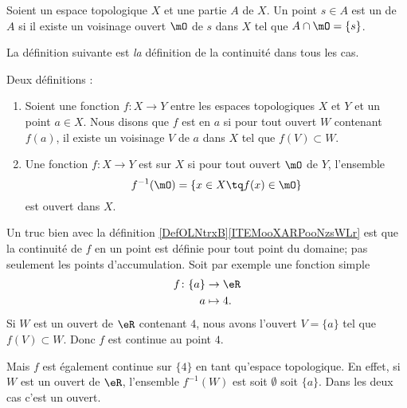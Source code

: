 \begin{definition}      \label{DEFooXIOWooWUKJhN}
	Soient un espace topologique \( X\) et une partie \( A\) de \( X\). Un point \( s\in A \) est un  de \( A\) si il existe un voisinage ouvert \( \mO\) de \( s\) dans \( X\) tel que \( A\cap\mO=\{ s \}\).
\end{definition}

La définition suivante est \emph{la} définition de la continuité dans tous les cas.
\begin{definition}\label{DefOLNtrxB}
	Deux définitions :
	\begin{enumerate}
		\item   \label{ITEMooXARPooNzsWLr}
		      Soient une fonction \( f\colon X\to Y\) entre les espaces topologiques \( X\) et \( Y\) et un point \( a\in X\). Nous disons que \( f\) est  en \( a\) si pour tout ouvert \( W\) contenant \( f(a)\), il existe un voisinage \( V\) de \( a\) dans \( X\) tel que \( f(V)\subset W\).
		\item       \label{ITEMooEHGWooDdITRV}
		      Une fonction \( f\colon X\to Y\) est  sur \( X\) si pour tout ouvert \( \mO\) de \( Y\), l'ensemble
		      \begin{equation}      \label{defFminus1ofaset}
			      f^{-1}(\mO) = \{ x \in X \tq f(x) \in \mO\}
		      \end{equation}
		      est ouvert dans \( X\).
	\end{enumerate}
\end{definition}

\begin{example}
	Un truc bien avec la définition \ref{DefOLNtrxB}\ref{ITEMooXARPooNzsWLr} est que la continuité de \( f\) en un point est définie pour tout point du domaine; pas seulement les points d'accumulation. Soit par exemple une fonction simple
	\begin{equation}
		\begin{aligned}
			f\colon \{a\} & \to \eR    \\
			a             & \mapsto 4.
		\end{aligned}
	\end{equation}
	Si \( W\) est un ouvert de \( \eR\) contenant \( 4\), nous avons l'ouvert \( V=\{a\}\) tel que \( f(V)\subset W\). Donc \( f\) est continue au point \( 4\).

	Mais \( f\) est également continue sur \( \{4\}\) en tant qu'espace topologique. En effet, si \( W\) est un ouvert de \( \eR\), l'ensemble \( f^{-1}(W)\) est soit \( \emptyset\) soit \( \{a\}\). Dans les deux cas c'est un ouvert.
\end{example}

